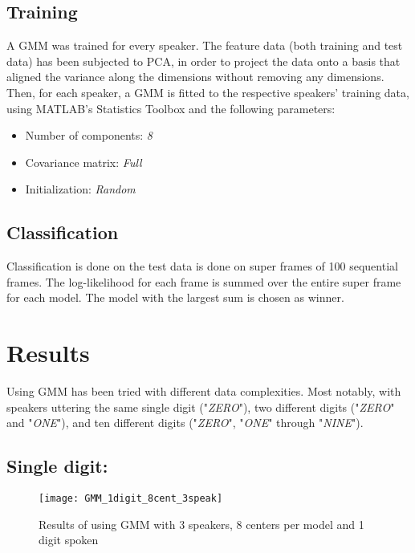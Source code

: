 \subsection{Training}
A GMM was trained for every speaker.
The feature data (both training and test data) has been subjected to PCA, in order to project the data onto a basis that aligned the variance along the dimensions without removing any dimensions. 
Then, for each speaker, a GMM is fitted to the respective speakers' training data, using MATLAB's Statistics Toolbox and the following parameters:

\begin{itemize}

\item
Number of components: \textit{8}

\item
Covariance matrix: \textit{Full}

\item
Initialization: \textit{Random}

\end{itemize}

\subsection{Classification}
Classification is done on the test data is done on super frames of 100 sequential frames.
The log-likelihood for each frame is summed over the entire super frame for each model.
The model with the largest sum is chosen as winner.



\section{Results}
Using GMM has been tried with different data complexities.
Most notably, with speakers uttering the same single digit ("\textit{ZERO}"), two different digits ("\textit{ZERO}" and "\textit{ONE}"), and ten different digits ("\textit{ZERO}", "\textit{ONE}" through "\textit{NINE}").

\subsection{Single digit:}

\begin{figure}[H]
\centering
\texttt{[image: GMM\_1digit\_8cent\_3speak]}
\caption{Results of using GMM with 3 speakers, 8 centers per model and 1 digit spoken}
\label{fig:GMM_fig_1}
\end{figure}

